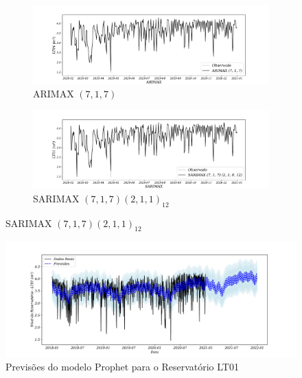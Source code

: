 \begin{figure}[H]
	\centering
	\caption{Comparação entre ARIMAX e SARIMAX}
	\begin{subfigure}{1\textwidth}
			\includegraphics[width=\linewidth]{Modelos/Figuras/ARIMAX}
			\caption{ARIMAX $(7,1,7)$}
			\label{fig:1-arimax}
		\end{subfigure}
	\hfill
	
	\begin{subfigure}{1\textwidth}
			\includegraphics[width=\linewidth]{Modelos/Figuras/SARIMAX}
			\caption{SARIMAX $(7,1,7) (2,1,1)_{12}$}
			\label{fig:1-sarimax}	
		\end{subfigure}

		
\end{figure}






\begin{figure}[H]
	\centering
	\caption{Previsões do modelo Prophet para o Reservatório LT01}\label{fig:prophet1}
	\includegraphics[width=1\linewidth]{Apendices/Figuras/modelagem-24h/prophet1}
	
\end{figure}



